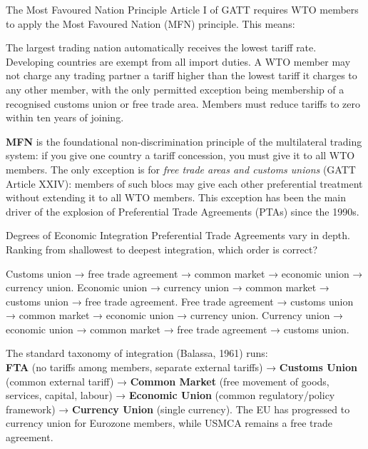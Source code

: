 \documentclass[paper=a5]{scrartcl}
\begin{document}
\begin{question}[type=mc]{The Most Favoured Nation Principle}
Article I of GATT requires WTO members to apply the Most Favoured Nation
(MFN) principle. This means:
\begin{choices}
  \choice        The largest trading nation automatically receives the lowest
                 tariff rate.
  \choice        Developing countries are exempt from all import duties.
  \correctchoice A WTO member may not charge any trading partner a tariff
                 higher than the lowest tariff it charges to any other member,
                 with the only permitted exception being membership of a
                 recognised customs union or free trade area.
  \choice        Members must reduce tariffs to zero within ten years of
                 joining.
\end{choices}
\begin{solution}
  \textbf{MFN} is the foundational non-discrimination principle of the
  multilateral trading system: if you give one country a tariff concession,
  you must give it to all WTO members. The only exception is for \emph{free
  trade areas and customs unions} (GATT Article XXIV): members of such
  blocs may give each other preferential treatment without extending it to
  all WTO members. This exception has been the main driver of the explosion
  of Preferential Trade Agreements (PTAs) since the 1990s.
\end{solution}
\end{question}

\begin{question}[type=mc]{Degrees of Economic Integration}
Preferential Trade Agreements vary in depth. Ranking from shallowest to
deepest integration, which order is correct?
\begin{choices}
  \choice        Customs union → free trade agreement → common market →
                 economic union → currency union.
  \choice        Economic union → currency union → common market → customs
                 union → free trade agreement.
  \correctchoice Free trade agreement → customs union → common market →
                 economic union → currency union.
  \choice        Currency union → economic union → common market → free trade
                 agreement → customs union.
\end{choices}
\begin{solution}
  The standard taxonomy of integration (Balassa, 1961) runs: \\
  \textbf{FTA} (no tariffs among members, separate external tariffs) →
  \textbf{Customs Union} (common external tariff) →
  \textbf{Common Market} (free movement of goods, services, capital, labour) →
  \textbf{Economic Union} (common regulatory/policy framework) →
  \textbf{Currency Union} (single currency).
  The EU has progressed to currency union for Eurozone members, while USMCA
  remains a free trade agreement.
\end{solution}
\end{question}
\end{document}
